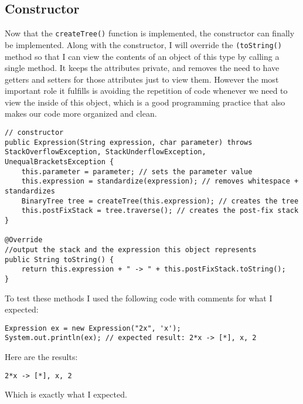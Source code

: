 \documentclass[../../../../main.tex]{subfiles}
\begin{document}
\subsection{Constructor}
Now that the \texttt{createTree()} function is implemented, the constructor can finally be implemented. Along with the constructor, I will override the \texttt{(toString()} method so that I can view the contents of an object of this type by calling a single method. It keeps the attributes private, and removes the need to have getters and setters for those attributes just to view them. However the most important role it fulfills is avoiding the repetition of code whenever we need to view the inside of this object, which is a good programming practice that also makes our code more organized and clean.

\begin{verbatim}
// constructor
public Expression(String expression, char parameter) throws StackOverflowException, StackUnderflowException, UnequalBracketsException {
	this.parameter = parameter; // sets the parameter value
	this.expression = standardize(expression); // removes whitespace + standardizes
	BinaryTree tree = createTree(this.expression); // creates the tree
	this.postFixStack = tree.traverse(); // creates the post-fix stack
}

@Override
//output the stack and the expression this object represents
public String toString() {
	return this.expression + " -> " + this.postFixStack.toString();
}
\end{verbatim}
To test these methods I used the following code with comments for what I expected:
\begin{verbatim}
Expression ex = new Expression("2x", 'x');
System.out.println(ex);	// expected result: 2*x -> [*], x, 2
\end{verbatim}
Here are the results:
\begin{verbatim}
2*x -> [*], x, 2
\end{verbatim}
Which is exactly what I expected.
\newpage
\end{document}
